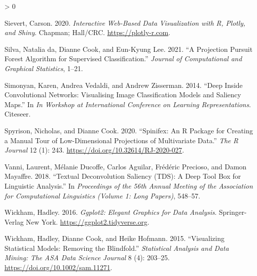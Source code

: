 \documentclass[
  article]{article}
\newlength{\cslhangindent}
\newenvironment{CSLReferences}[2] %
 {%
  \setlength{\parindent}{0pt}
  \ifodd #1 \everypar{\setlength{\hangindent}{\cslhangindent}}\ignorespaces\fi
  \ifnum #2 > 0
  \setlength{\parskip}{#2\baselineskip}
  \fi
 }%
 {}
\begin{document}
\begin{CSLReferences}{1}{0}
\leavevmode\hypertarget{ref-sievert_interactive_2020}{}%
Sievert, Carson. 2020. \emph{Interactive {Web}-{Based} {Data} {Visualization} with {R}, Plotly, and Shiny}. Chapman; Hall/CRC. \url{https://plotly-r.com}.

\leavevmode\hypertarget{ref-da_silva_projection_2021}{}%
Silva, Natalia da, Dianne Cook, and Eun-Kyung Lee. 2021. {``A {Projection} {Pursuit} {Forest} {Algorithm} for {Supervised} {Classification}.''} \emph{Journal of Computational and Graphical Statistics}, 1--21.

\leavevmode\hypertarget{ref-simonyan_deep_2014}{}%
Simonyan, Karen, Andrea Vedaldi, and Andrew Zisserman. 2014. {``Deep Inside Convolutional Networks: {Visualising} Image Classification Models and Saliency Maps.''} In \emph{In {Workshop} at {International} {Conference} on {Learning} {Representations}}. Citeseer.

\leavevmode\hypertarget{ref-spyrison_spinifex_2020}{}%
Spyrison, Nicholas, and Dianne Cook. 2020. {``Spinifex: An {R} {Package} for {Creating} a {Manual} {Tour} of {Low}-Dimensional {Projections} of {Multivariate} {Data}.''} \emph{The R Journal} 12 (1): 243. \url{https://doi.org/10.32614/RJ-2020-027}.

\leavevmode\hypertarget{ref-vanni_textual_2018}{}%
Vanni, Laurent, Mélanie Ducoffe, Carlos Aguilar, Frédéric Precioso, and Damon Mayaffre. 2018. {``Textual {Deconvolution} {Saliency} ({TDS}): A Deep Tool Box for Linguistic Analysis.''} In \emph{Proceedings of the 56th {Annual} {Meeting} of the {Association} for {Computational} {Linguistics} ({Volume} 1: {Long} {Papers})}, 548--57.

\leavevmode\hypertarget{ref-wickham_ggplot2_2016}{}%
Wickham, Hadley. 2016. \emph{Ggplot2: {Elegant} {Graphics} for {Data} {Analysis}}. Springer-Verlag New York. \url{https://ggplot2.tidyverse.org}.

\leavevmode\hypertarget{ref-wickham_visualizing_2015}{}%
Wickham, Hadley, Dianne Cook, and Heike Hofmann. 2015. {``Visualizing Statistical Models: {Removing} the Blindfold.''} \emph{Statistical Analysis and Data Mining: The ASA Data Science Journal} 8 (4): 203--25. \url{https://doi.org/10.1002/sam.11271}.

\end{CSLReferences}
\end{document}
